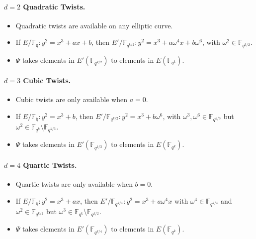 \paragraph{$d = 2$ Quadratic Twists.}

\begin{itemize}
	\item Quadratic twists are available on any elliptic curve.
	\item If $E/\mathbb{F_q}: y^2 = x^3 + ax+ b$, then $E'/\mathbb{F}_{q^{k/2}}: y^2 = x^3 + a\omega^4 x + b\omega^6$, with $\omega^2 \in \mathbb{F}_{q^{k/2}}$.
	\item $\Psi$ takes elements in $E'(\mathbb{F}_{q^{k/2}})$ to elements in $E(\mathbb{F}_{q^k})$.
\end{itemize}

\paragraph{$d=3$ Cubic Twists.}

\begin{itemize}
	\item Cubic twists are only available when $a = 0$.
	\item If $E/\mathbb{F_q}: y^2 = x^3 + b$, then $E'/\mathbb{F}_{q^{k/2}}: y^2 = x^3 + b\omega^6$, with $\omega^3, \omega^6 \in \mathbb{F}_{q^{k/3}}$ but $\omega^2 \in \mathbb{F}_{q^k} \setminus \mathbb{F}_{q^{k/3}}$.
	\item $\Psi$ takes elements in $E'(\mathbb{F}_{q^{k/3}})$ to elements in $E(\mathbb{F}_{q^k})$.
\end{itemize}

\paragraph{$d=4$ Quartic Twists.}

\begin{itemize}
	\item Quartic twists are only available when $b = 0$.
	\item If $E/\mathbb{F_q}: y^2 = x^3 + ax$, then $E'/\mathbb{F}_{q^{k/4}}: y^2 = x^3 + a\omega^4 x$ with $\omega^4 \in \mathbb{F}_{q^{k/4}}$ and $\omega^2 \in \mathbb{F}_{q^{k/2}}$ but $\omega^3 \in \mathbb{F}_{q^k} \setminus \mathbb{F}_{q^{k/2}}$.
	\item $\Psi$ takes elements in $E'(\mathbb{F}_{q^{k/4}})$ to elements in $E(\mathbb{F}_{q^k})$.
\end{itemize}

